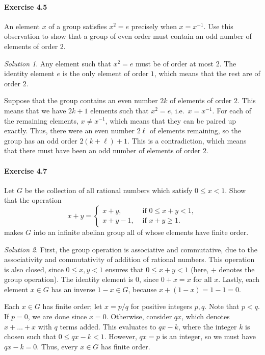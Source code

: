 \documentclass[11pt]{report}
\theoremstyle{remark}
\newtheorem*{solution}{Solution}
\begin{document}
    
    \paragraph{Exercise 4.5} An element $x$ of a group satisfies $x^2 = e$ precisely
    when $x = x^{-1}$. Use this observation to show that a group of even order must
    contain an odd number of elements of order $2$.
    \begin{solution}
        Any element such that $x^2 = e$ must be of order at most $2$. The identity
        element $e$ is the only element of order $1$, which means that the rest are
        of order $2$.

        Suppose that the group contains an even number $2k$ of elements of order $2$.
        This means that we have $2k + 1$ elements such that $x^2 = e$, i.e.\ $x =
        x^{-1}$. For each of the remaining elements, $x \neq x^{-1}$, which means
        that they can be paired up exactly. Thus, there were an even number $2\ell$
        of elements remaining, so the group has an odd order $2(k + \ell) + 1$. This
        is a contradiction, which means that there must have been an odd number of
        elements of order $2$.
    \end{solution}


    \paragraph{Exercise 4.7} Let $G$ be the collection of all rational numbers which
    satisfy $0 \leq x < 1$. Show that the operation \[
        x + y = \begin{cases}
            x + y, &\text{ if } 0 \leq x + y < 1, \\
            x + y - 1, &\text{ if } x + y \geq 1.
        \end{cases}
    \] makes $G$ into an infinite abelian group all of whose elements have finite
    order.
    \begin{solution}
        First, the group operation is associative and commutative, due to the
        associativity and commutativity of addition of rational numbers. This
        operation is also closed, since $0 \leq x, y < 1$ ensures that $0 \leq x + y
        < 1$ (here, $+$ denotes the group operation). The identity element is $0$,
        since $0 + x = x$ for all $x$. Lastly, each element $x \in G$ has an inverse
        $1 - x \in G$, because $x + (1 - x) = 1 - 1 = 0$.

        Each $x \in G$ has finite order; let $x = p / q$ for positive integers $p,
        q$. Note that $p < q$. If $p = 0$, we are done since $x = 0$. Otherwise,
        consider $qx$, which denotes $x + \dots + x$ with $q$ terms added. This
        evaluates to $qx - k$, where the integer $k$ is chosen such that $0 \leq qx
        - k < 1$. However, $qx = p$ is an integer, so we must have $qx - k = 0$.
        Thus, every $x \in G$ has finite order.
    \end{solution}
    
\end{document}
